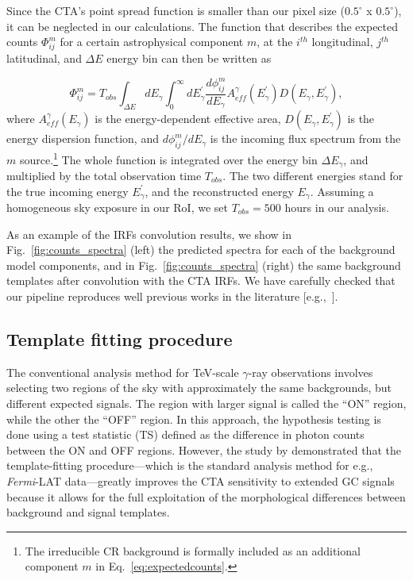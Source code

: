 \documentclass[doublespace,draft,nopageskip]{VTthesis} %
\begin{document}
Since the CTA's point spread function is smaller than our pixel size ($0.5^{\circ} $ x $ 0.5^{\circ}$), it can be neglected in our calculations. The function that describes the expected counts $\Phi^m_{ij}$ for a certain astrophysical component $m$, at the $i^{th}$ longitudinal, $j^{th}$ latitudinal, and $\Delta E$ energy bin can then be written as

\begin{equation}\label{eq:expectedcounts}
    \Phi^m_{ij} = T_{obs} \int_{\Delta E} dE_{\gamma} \int_{0}^{\infty} dE^{'}_{\gamma}  \frac{d\phi^{m}_{ij}}{dE_{\gamma}} A^{\gamma}_{eff}(E^{'}_{\gamma}) D(E_{\gamma},E_{\gamma}^{'}),
\end{equation} 
where $A^{\gamma}_{eff}(E_\gamma)$ is the energy-dependent effective area, $D(E_{\gamma},E_{\gamma}^{'})$ is the energy dispersion function, and $d\phi^{m}_{ij}/dE_{\gamma}$ is the incoming flux spectrum from the $m$ source.\footnote{The irreducible CR background is formally included as an additional component $m$ in Eq.~\ref{eq:expectedcounts}.} The whole function is integrated over the energy bin $\Delta E_{\gamma}$, and multiplied by the total observation time $T_{obs}$. The two different energies stand for the true incoming energy $E_{\gamma}^{'}$, and the reconstructed energy $E_{\gamma}$. Assuming a homogeneous sky exposure in our RoI, we set $T_{obs}=500$ hours in our analysis. 

As an example of the IRFs convolution results, we show in Fig.~\ref{fig:counts_spectra} (left) the predicted spectra for each of the background model components, and in Fig.~\ref{fig:counts_spectra} (right) the same background templates after convolution with the CTA IRFs. We have carefully checked that our pipeline reproduces well previous works in the literature [e.g.,~\citep{Rinchiuso:2020skh}].


\subsection{Template fitting procedure}
\label{sub:templatefitting}

The conventional analysis method for TeV-scale $\gamma$-ray observations involves selecting two regions of the sky with approximately the same backgrounds, 
but different expected signals. The region with larger signal is called the ``ON'' region, while the other the ``OFF'' region. In this approach, the hypothesis testing is done using a test statistic (TS) defined as the difference in photon counts between the ON and OFF regions. However, the study by \cite{Silverwood:2014yza} demonstrated that the template-fitting procedure---which is the standard analysis method for e.g., \textit{Fermi}-LAT data---greatly improves the CTA sensitivity to extended GC signals because it allows for the full exploitation of the morphological differences between background and signal templates. 
\end{document}
